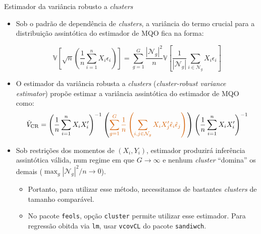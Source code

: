 \documentclass[11pt]{beamer}
\begin{document}
	\begin{frame}{Estimador da variância robusto a \textit{clusters}}
		\begin{itemize}
			\item Sob o padrão de dependência de \textit{clusters}, a variância do termo crucial para a distribuição assintótica do estimador de MQO fica na forma:
			
			$$\mathbb{V}\left[\sqrt{n}\left(\frac{1}{n}\sum_{i=1}^nX_i \epsilon_i \right)\right] =   \sum_{g=1}^G \frac{|\mathcal{N}_g|^2}{n} \mathbb{V}\left[\frac{1}{|\mathcal{N}_g|}\sum_{i \in \mathcal{N}_g} X_i \epsilon_i \right]$$
			\item O estimador da variância robusta a \textit{clusters} (\textit{cluster-robust variance estimator}) propõe estimar a variância assintótica do estimador de MQO como:
			\vspace{-0.5em}
			$$\hat{V}_{\text{CR}} =  \left(\frac{1}{n}\sum_{i=1}^n X_i X_i'\right)^{-1}\left({\color{red}
			\sum_{g=1}^G \frac{1}{n} \left(\sum_{i,j \in \mathcal{N}_g} X_i X_j'\hat{\epsilon}_i \hat{\epsilon}_j\right) }\right) \left(\frac{1}{n}\sum_{i=1}^n X_i X_i'\right)^{-1}$$
			
			\item Sob restrições dos momentos de $(X_i,Y_i)$, estimador produzirá inferência assintótica válida, num regime em que $G \to \infty $ e nenhum \textit{cluster} ``domina'' os demais ($\max_g |\mathcal{N}_g|^2/n \to 0$).
			\begin{itemize}
				\item Portanto, para utilizar esse método, necessitamos de bastantes \textit{clusters} de tamanho comparável.
				\item No pacote \texttt{feols}, opção \texttt{cluster} permite utilizar esse estimador. Para regressão obitda via \texttt{lm}, usar \texttt{vcovCL} do pacote \texttt{sandiwch}.
			\end{itemize}
		\end{itemize}
	\end{frame}
\end{document}
